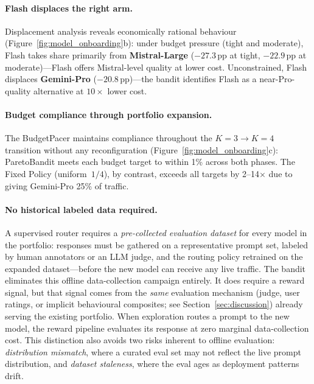 \paragraph{Flash displaces the right arm.}
Displacement analysis reveals economically rational behaviour (Figure~\ref{fig:model_onboarding}b):
under budget pressure (tight and moderate), Flash takes share primarily from \textbf{Mistral-Large} ($-27.3$\,pp at tight, $-22.9$\,pp at moderate)---Flash offers Mistral-level quality at lower cost.
Unconstrained, Flash displaces \textbf{Gemini-Pro} ($-20.8$\,pp)---the bandit identifies Flash as a near-Pro-quality alternative at $10\times$ lower cost.

\paragraph{Budget compliance through portfolio expansion.}
The BudgetPacer maintains compliance throughout the $K{=}3 \to K{=}4$ transition without any reconfiguration (Figure~\ref{fig:model_onboarding}c): ParetoBandit meets each budget target to within 1\% across both phases.
The Fixed Policy (uniform~$1/4$), by contrast, exceeds all targets by 2--14$\times$ due to giving Gemini-Pro 25\% of traffic.

\paragraph{No historical labeled data required.}
A supervised router requires a \emph{pre-collected evaluation dataset} for every model in the portfolio: responses must be gathered on a representative prompt set, labeled by human annotators or an LLM judge, and the routing policy retrained on the expanded dataset---before the new model can receive any live traffic.  The bandit eliminates this offline data-collection campaign entirely.  It does require a reward signal, but that signal comes from the \emph{same} evaluation mechanism (judge, user ratings, or implicit behavioural composites; see Section~\ref{sec:discussion}) already serving the existing portfolio.  When exploration routes a prompt to the new model, the reward pipeline evaluates its response at zero marginal data-collection cost.  This distinction also avoids two risks inherent to offline evaluation: \emph{distribution mismatch}, where a curated eval set may not reflect the live prompt distribution, and \emph{dataset staleness}, where the eval ages as deployment patterns drift.


